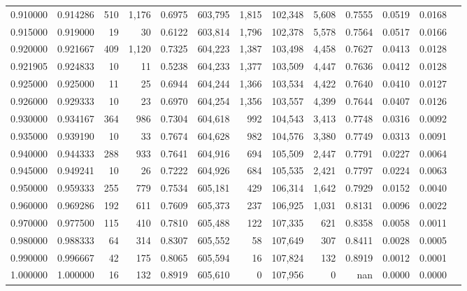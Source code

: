 \begin{tabular}{rrrrrrrrrrrrr}
0.910000 & 0.914286 &    510 & 1,176 &                                     0.6975 & 603,795 &   1,815 & 102,348 &   5,608 & 0.7555 & 0.0519 & 0.0168 \\
0.915000 & 0.919000 &     19 &    30 &                                     0.6122 & 603,814 &   1,796 & 102,378 &   5,578 & 0.7564 & 0.0517 & 0.0166 \\
0.920000 & 0.921667 &    409 & 1,120 &                                     0.7325 & 604,223 &   1,387 & 103,498 &   4,458 & 0.7627 & 0.0413 & 0.0128 \\
0.921905 & 0.924833 &     10 &    11 &                                     0.5238 & 604,233 &   1,377 & 103,509 &   4,447 & 0.7636 & 0.0412 & 0.0128 \\
0.925000 & 0.925000 &     11 &    25 &                                     0.6944 & 604,244 &   1,366 & 103,534 &   4,422 & 0.7640 & 0.0410 & 0.0127 \\
0.926000 & 0.929333 &     10 &    23 &                                     0.6970 & 604,254 &   1,356 & 103,557 &   4,399 & 0.7644 & 0.0407 & 0.0126 \\
0.930000 & 0.934167 &    364 &   986 &                                     0.7304 & 604,618 &     992 & 104,543 &   3,413 & 0.7748 & 0.0316 & 0.0092 \\
0.935000 & 0.939190 &     10 &    33 &                                     0.7674 & 604,628 &     982 & 104,576 &   3,380 & 0.7749 & 0.0313 & 0.0091 \\
0.940000 & 0.944333 &    288 &   933 &                                     0.7641 & 604,916 &     694 & 105,509 &   2,447 & 0.7791 & 0.0227 & 0.0064 \\
0.945000 & 0.949241 &     10 &    26 &                                     0.7222 & 604,926 &     684 & 105,535 &   2,421 & 0.7797 & 0.0224 & 0.0063 \\
0.950000 & 0.959333 &    255 &   779 &                                     0.7534 & 605,181 &     429 & 106,314 &   1,642 & 0.7929 & 0.0152 & 0.0040 \\
0.960000 & 0.969286 &    192 &   611 &                                     0.7609 & 605,373 &     237 & 106,925 &   1,031 & 0.8131 & 0.0096 & 0.0022 \\
0.970000 & 0.977500 &    115 &   410 &                                     0.7810 & 605,488 &     122 & 107,335 &     621 & 0.8358 & 0.0058 & 0.0011 \\
0.980000 & 0.988333 &     64 &   314 &                                     0.8307 & 605,552 &      58 & 107,649 &     307 & 0.8411 & 0.0028 & 0.0005 \\
0.990000 & 0.996667 &     42 &   175 &                                     0.8065 & 605,594 &      16 & 107,824 &     132 & 0.8919 & 0.0012 & 0.0001 \\
1.000000 & 1.000000 &     16 &   132 &                                     0.8919 & 605,610 &       0 & 107,956 &       0 &    nan & 0.0000 & 0.0000 \\
\bottomrule
\end{tabular}
